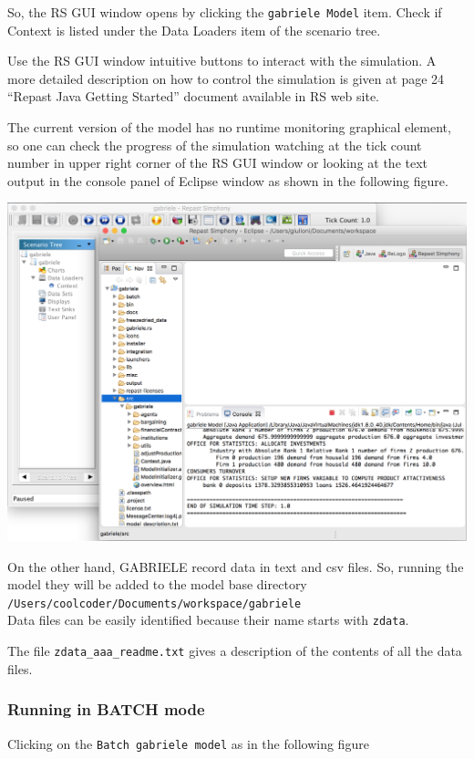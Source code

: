 \documentclass{book}
\begin{document}
So, the RS GUI window opens by clicking the \verb+gabriele Model+ item. Check if Context is listed under the Data Loaders item of the scenario tree.

Use the RS GUI window intuitive buttons to interact with the simulation. A more detailed description on how to control the simulation is given at page 24 ``Repast Java Getting Started'' document available in RS web site.

The current version of the model has no runtime monitoring graphical element, so one can check the progress of the simulation watching at the tick count number in upper right corner of the RS GUI window or looking at the text output in the console panel of Eclipse window as shown in the following figure. 

\noindent
\includegraphics[scale=0.35]{fig_gabriele_rs_gui7}

On the other hand, GABRIELE record data in text and csv files. So, running the model they will be added to the model base directory\\
\verb+/Users/coolcoder/Documents/workspace/gabriele+\\
Data files can be easily identified because their name starts with \verb+zdata+.

The file \verb+zdata_aaa_readme.txt+ gives a description of the contents of all the data files.

\subsubsection{Running in BATCH mode}

Clicking on the \verb+Batch gabriele model+ as in the following figure
\end{document}
